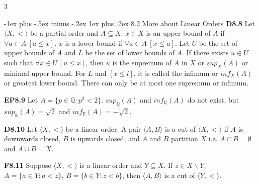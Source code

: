 \documentclass[10pt, landscape]{article}
\makeatletter
\renewcommand{\subsection}{\@startsection{subsection}{3}{0mm}%
                                {-1ex plus -.5ex minus -.2ex}%
                                {1ex plus .2ex}%
                                {\normalfont\small\bfseries}}%
\makeatother
\begin{document}
\begin{multicols*}{3}



\subsection{8.2 More about Linear Orders}
\textbf{D8.8} Let $\langle X, < \rangle$ be a partial order and $A \subseteq X$. $x \in X$ is an upper bound of $A$ if $\forall a \in A \ [a \leq x]$. $x$ is a lower bound if $\forall a \in A \ [x \leq a]$. Let $U$ be the set of upper bounds of $A$ and $L$ be the set of lower bounds of $A$. If there exists $u \in U$ such that $\forall x \in U \ [u \leq x]$, then $u$ is the supremum of $A$ in $X$ or $sup_X(A)$ or minimal upper bound. For $L$ and $[x \leq l]$, it is called the infimum or $inf_X(A)$ or greatest lower bound. There can only be at most one supremum or infimum.

\textbf{EP8.9} Let $A=\{p \in \mathbb{Q} : p^2 < 2\}$. $sup_\mathbb{Q}(A)$ and $inf_\mathbb{Q}(A)$ do not exist, but $sup_\mathbb{R}(A)=\sqrt2$ and $inf_\mathbb{R}(A)=-\sqrt2$.

\textbf{D8.10} Let $\langle X, < \rangle$ be a linear order. A pair $\langle A, B \rangle$ is a cut of $\langle X, < \rangle$ if $A$ is downwards closed, $B$ is upwards closed, and $A$ and $B$ partition $X$ i.e. $A \cap B = \emptyset$ and $A \cup B = X$.

\textbf{F8.11} Suppose $\langle X, < \rangle$ is a linear order and $Y \subseteq X$. If $z \in X \backslash Y$, $A=\{a \in Y:a<z\}$, $B=\{b \in Y: z <b\}$, then $\langle A, B \rangle$ is a cut of $\langle Y, < \rangle$.


\end{multicols*}
\end{document}
